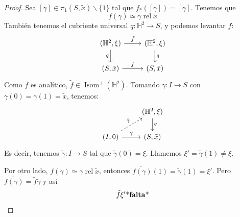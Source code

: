 \documentclass[spanish]{article}
\theoremstyle{definition}
\newcommand{\Hy}{\mathbb{H}}
\DeclareMathOperator{\rel}{rel}
\DeclareMathOperator{\Isom}{Isom}
\begin{document}
\begin{proof}
	Sea $[\gamma]\in\pi_1(S,\tilde{x})\backslash\{1\}$ tal que $f_*([\gamma])=[\gamma]$. Tenemos que \[f(\gamma)\simeq\gamma\rel\tilde{x}\]
	También tenemos el cubriente universal $q:\Hy^2\to S$, y podemos levantar $f$:
	\[\begin{tikzcd}
		(\Hy^2,\xi)\arrow[r,"\tilde{f}"]\arrow[swap,d,"q"]&(\Hy^2,\xi)\arrow[d,"q"]\\
		(S,\tilde{x})\arrow[r,"f"]&(S,\tilde{x})
	\end{tikzcd}\]
	Como $f$ es analítico, $\tilde{f}\in\Isom^+(\Hy^2)$. Tomando $\gamma:I\to S$ con $\gamma(0)=\gamma(1)=\tilde{x}$, tenemos:
	\[\begin{tikzcd}
		&(\Hy^2,\xi)\arrow[d,"q"]\\
		(I,0)\arrow[r,"\gamma"]\arrow[ur,dashed,"\tilde{\gamma}"]&(S,\tilde{x})
	\end{tikzcd}\]
	Es decir, tenemos $\tilde{\gamma}:I\to S$ tal que $\tilde{\gamma}(0)=\xi$. Llamemos $\xi'=\tilde{\gamma}(1)\neq\xi$.
	
	Por otro lado, $f(\gamma)\simeq\gamma\rel\tilde{x}$, entonces $\widetilde{f(\gamma)}(1)=\tilde{\gamma}(1)=\xi'$. Pero $\widetilde{f(\gamma)}=\tilde{f}\tilde{\gamma}$ y así
	\[\tilde{f}\xi'\text{*\textbf{falta}*}\]
\end{proof}
\end{document}
